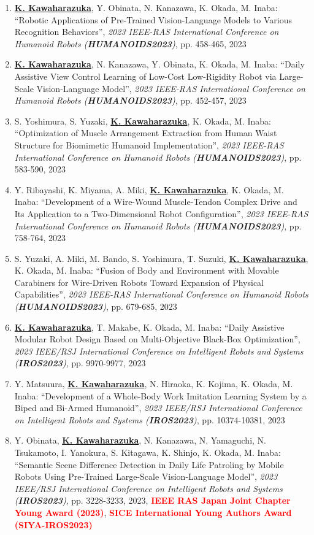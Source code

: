 \documentclass[letterpaper,11pt]{article}
\begin{document}
\begin{enumerate}
\item \underline{\textbf{K. Kawaharazuka}}, Y. Obinata, N. Kanazawa, K. Okada, M. Inaba: ``Robotic Applications of Pre-Trained Vision-Language Models to Various Recognition Behaviors'', \textit{2023 IEEE-RAS International Conference on Humanoid Robots (\textit{\textbf{HUMANOIDS2023}})}, pp. 458-465, 2023
\item \underline{\textbf{K. Kawaharazuka}}, N. Kanazawa, Y. Obinata, K. Okada, M. Inaba: ``Daily Assistive View Control Learning of Low-Cost Low-Rigidity Robot via Large-Scale Vision-Language Model'', \textit{2023 IEEE-RAS International Conference on Humanoid Robots (\textit{\textbf{HUMANOIDS2023}})}, pp. 452-457, 2023
\item S. Yoshimura, S. Yuzaki, \underline{\textbf{K. Kawaharazuka}}, K. Okada, M. Inaba: ``Optimization of Muscle Arrangement Extraction from Human Waist Structure for Biomimetic Humanoid Implementation'', \textit{2023 IEEE-RAS International Conference on Humanoid Robots (\textit{\textbf{HUMANOIDS2023}})}, pp. 583-590, 2023
\item Y. Ribayashi, K. Miyama, A. Miki, \underline{\textbf{K. Kawaharazuka}}, K. Okada, M. Inaba: ``Development of a Wire-Wound Muscle-Tendon Complex Drive and Its Application to a Two-Dimensional Robot Configuration'', \textit{2023 IEEE-RAS International Conference on Humanoid Robots (\textit{\textbf{HUMANOIDS2023}})}, pp. 758-764, 2023
\item S. Yuzaki, A. Miki, M. Bando, S. Yoshimura, T. Suzuki, \underline{\textbf{K. Kawaharazuka}}, K. Okada, M. Inaba: ``Fusion of Body and Environment with Movable Carabiners for Wire-Driven Robots Toward Expansion of Physical Capabilities'', \textit{2023 IEEE-RAS International Conference on Humanoid Robots (\textit{\textbf{HUMANOIDS2023}})}, pp. 679-685, 2023
\item \underline{\textbf{K. Kawaharazuka}}, T. Makabe, K. Okada, M. Inaba: ``Daily Assistive Modular Robot Design Based on Multi-Objective Black-Box Optimization'', \textit{2023 IEEE/RSJ International Conference on Intelligent Robots and Systems (\textit{\textbf{IROS2023}})}, pp. 9970-9977, 2023
\item Y. Matsuura, \underline{\textbf{K. Kawaharazuka}}, N. Hiraoka, K. Kojima, K. Okada, M. Inaba: ``Development of a Whole-Body Work Imitation Learning System by a Biped and Bi-Armed Humanoid'', \textit{2023 IEEE/RSJ International Conference on Intelligent Robots and Systems (\textit{\textbf{IROS2023}})}, pp. 10374-10381, 2023
\item Y. Obinata, \underline{\textbf{K. Kawaharazuka}}, N. Kanazawa, N. Yamaguchi, N. Tsukamoto, I. Yanokura, S. Kitagawa, K. Shinjo, K. Okada, M. Inaba: ``Semantic Scene Difference Detection in Daily Life Patroling by Mobile Robots Using Pre-Trained Large-Scale Vision-Language Model'', \textit{2023 IEEE/RSJ International Conference on Intelligent Robots and Systems (\textit{\textbf{IROS2023}})}, pp. 3228-3233, 2023, \textbf{\textcolor{red}{IEEE RAS Japan Joint Chapter Young Award (2023)}}, \textbf{\textcolor{red}{SICE International Young Authors Award (SIYA-IROS2023)}}

\end{enumerate}
\end{document}
